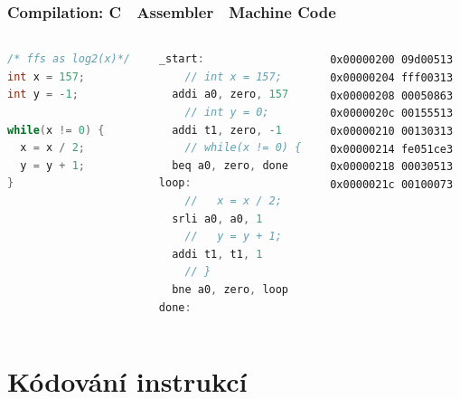 \documentclass{beamer}
\begin{document}
\begin{frame}[fragile,shrink=10]
\frametitle{Compilation: C  Assembler  Machine Code}

\begin{columns}
\begin{column}{0.3\textwidth}
\begin{lstlisting}[language={C},columns=flexible]
/* ffs as log2(x)*/
int x = 157;
int y = -1;
 
while(x != 0) {
  x = x / 2;
  y = y + 1;
}
\end{lstlisting}
\end{column}

\begin{column}{0.4\textwidth}  
\begin{lstlisting}[language={C},columns=flexible]
_start:
    // int x = 157;
  addi a0, zero, 157  
    // int y = 0;
  addi t1, zero, -1   
    // while(x != 0) {
  beq a0, zero, done  
loop:
    //   x = x / 2;
  srli a0, a0, 1 
    //   y = y + 1;
  addi t1, t1, 1      
    // }
  bne a0, zero, loop  
done:
\end{lstlisting}
\end{column}

\begin{column}{0.3\textwidth}  
\texttt{0x00000200  09d00513\\
0x00000204  fff00313\\
0x00000208  00050863\\
0x0000020c  00155513\\
0x00000210  00130313\\
0x00000214  fe051ce3\\
0x00000218  00030513\\
0x0000021c  00100073}
\end{column}

\end{columns}

\end{frame}

\section{Kódování instrukcí}
\end{document}
